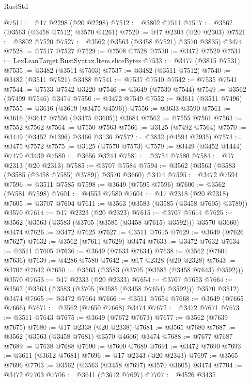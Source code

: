 \begin{lexlean}{RustStd}
\begin{coremodule}
@7511 := @17 @2298 (@20 @2298)
@7512 := @3802 @7511
@7517 := @3562 (@3563 (@3458 @7512) @3570 @4261)
@7520 := @17 @2303 (@20 @2303)
@7521 := @3802 @7520
@7527 := @3562 (@3563 (@3458 @7521) @3570 @3835) @3474
@7528 := @7517 @7527
@7529 := @7508 @7528
@7530 := @3472 @7529
@7531 := LexLeanTarget.RustSyntax.Item.sliceBytes
@7533 := @3477 (@3815 @7531)
@7535 := @3482 (@3511 @7503)
@7537 := @3482 (@3511 @7512)
@7540 := @3482 (@3511 @7521) @3488
@7541 := @7537 @7540
@7542 := @7535 @7541
@7544 := @7533 @7542 @3220
@7546 := @3649 (@7530 @7544)
@7549 := @3562 (@7499 @7546) @3474
@7550 := @3472 @7549
@7552 := @3611 (@3511 @7496)
@7555 := @3616 (@3619 (@3475 @4596))
@7556 := @3633 @3590
@7561 := @3616 (@3617 @7556 (@3475 @3605)) @3684
@7562 := @7555 @7561
@7563 := @7552 @7562
@7564 := @7550 @7563
@7566 := @3125 (@7492 @7564)
@7570 := @3449 (@3452 @1396) @3466 @3136
@7572 := @3832 (@4594 @2935)
@7573 := @3475 @7572
@7575 := @3125 (@7570 @7573)
@7579 := @3449 (@3452 @1444) @7479 @3439
@7580 := @3656 @3244
@7581 := @3754 @7580
@7584 := @17 @2313 (@20 @2313)
@7585 := @3707 @7584
@7594 := @3562 (@3563 (@3583 (@3585 (@3458 @7585) @3789)) @3570 @3660) @3474
@7595 := @3472 @7594
@7596 := @3511 @7585
@7598 := @3649 (@7595 @7596)
@7600 := @3562 (@7581 @7598)
@7601 := @4553 @7580
@7604 := @17 @2318 (@20 @2318)
@7605 := @3707 @7604
@7611 := @3563 (@3583 (@3585 (@3458 @7605) @3789)) @3570
@7614 := @17 @2323 (@20 @2323)
@7615 := @3707 @7614
@7625 := @3562 (@3563 (@3583 (@3705 (@3585 (@3458 @7615) @3592))) @3570 @3660) @3474
@7626 := @3472 @7625
@7627 := @3511 @7615
@7629 := @3649 (@7626 @7627)
@7632 := @3562 (@7611 @7629) @3474
@7633 := @3472 @7632
@7634 := @3511 @7605
@7636 := @3649 (@7633 @7634)
@7638 := @3562 (@7601 @7636)
@7639 := @4286 @7580
@7642 := @17 @2328 (@20 @2328)
@7643 := @3707 @7642
@7650 := @3563 (@3583 (@3705 (@3585 (@3458 @7643) @3592))) @3570
@7653 := @17 @2333 (@20 @2333)
@7654 := @3707 @7653
@7664 := @3562 (@3563 (@3583 (@3705 (@3585 (@3458 @7654) @3592))) @3570 @3512) @3474
@7665 := @3472 @7664
@7666 := @3511 @7654
@7668 := @3649 (@7665 @7666)
@7671 := @3562 (@7650 @7668) @3474
@7672 := @3472 @7671
@7673 := @3511 @7643
@7675 := @3649 (@7672 @7673)
@7677 := @3562 (@7639 @7675)
@7680 := @17 @2338 (@20 @2338)
@7681 := @3565 @7680
@7687 := @3562 (@3563 (@3458 @7681) @3570 @4606) @3474
@7688 := @7677 @7687
@7689 := @7638 @7688
@7690 := @7600 @7689
@7691 := @3472 @7690
@7693 := @3611 (@3612 @7681)
@7696 := @17 @2343 (@20 @2343)
@7697 := @3565 @7696
@7703 := @3562 (@3563 (@3458 @7697) @3570 @3605) @3474
@7704 := @3472 @7703
@7706 := @3611 (@3612 @7697)
@7707 := @4526 @3435

\end{coremodule}
\end{lexlean}
